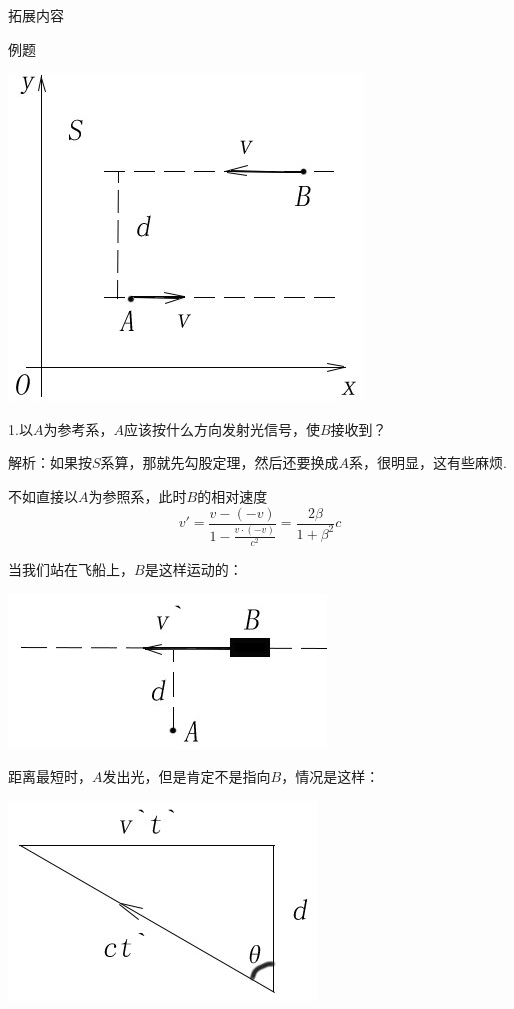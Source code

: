 \documentclass[a4paper,titlepage,onecolmn]{ctexart}
\begin{document}
\begin{section}{拓展内容}
\begin{subsection}{例题}
\begin{multicols}{2}
\hspace{3em}\includegraphics[scale=0.5]{Chp5_addin_illus (5).jpg}
\end{multicols}
1.以$A$为参考系，$A$应该按什么方向发射光信号，使$B$接收到？

解析：如果按$S$系算，那就先勾股定理，然后还要换成$A$系，很明显，这有些麻烦.

不如直接以$A$为参照系，此时$B$的相对速度
\begin{equation*}
v'=\frac{v-(-v)}{1-\frac{v\cdot(-v)}{c^2}}=\frac{2\beta}{1+\beta^2}c
\end{equation*}

当我们站在飞船上，$B$是这样运动的：

\hspace{17em}\includegraphics[scale=0.6]{Chp5_addin_illus (6).jpg}

距离最短时，$A$发出光，但是肯定不是指向$B$，情况是这样：

\hspace{17em}\includegraphics[scale=0.6]{Chp5_addin_illus (7).jpg}


\end{subsection}
\end{section}
\end{document}
